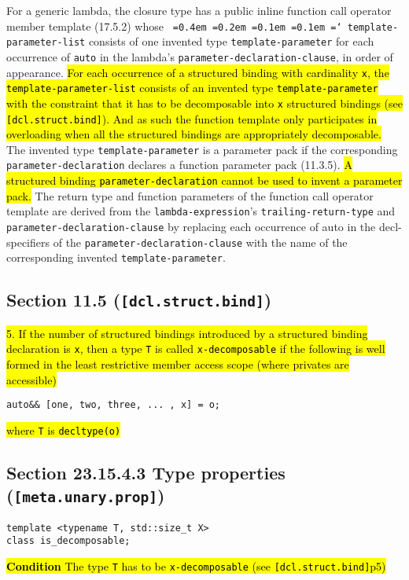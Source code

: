 \documentclass{article}
\DeclareRobustCommand{\hlgreen}[1]{{\sethlcolor{green}\hl{#1}}}
\newcommand*\justify{%
  \fontdimen2\font=0.4em%
  \fontdimen3\font=0.2em%
  \fontdimen4\font=0.1em%
  \fontdimen7\font=0.1em%
  \hyphenchar\font=`\-%
}
\begin{document}
For a generic lambda, the closure type has a public inline function call
operator member template (17.5.2) whose \texttt{\justify template-parameter-list}
consists of one invented type \texttt{template-parameter} for each occurrence
of \texttt{auto} in the lambda’s \texttt{parameter-declaration-clause}, in
order of appearance.  \hlgreen{For each occurrence of a structured binding with
cardinality \texttt{x}, the \texttt{template-parameter-list} consists of an
invented type \texttt{template-parameter} with the constraint that it has to
be decomposable into \texttt{x} structured bindings (see
\texttt{[dcl.struct.bind]}).  And as such the function template only
participates in overloading when all the structured bindings are appropriately
decomposable.} The invented type \texttt{template-parameter} is a parameter
pack if the corresponding \texttt{parameter-declaration} declares a function
parameter pack (11.3.5).  \hlgreen{A structured binding
\texttt{parameter-declaration} cannot be used to invent a parameter pack.} The
return type and function parameters of the function call operator template are
derived from the \texttt{lambda-expression}’s \texttt{trailing-return-type}
and \texttt{parameter-declaration-clause} by replacing each occurrence of auto
in the decl-specifiers of the \texttt{parameter-declaration-clause} with the
name of the corresponding invented \texttt{template-parameter}.


\subsection{Section 11.5 (\texttt{[dcl.struct.bind]})}

\hlgreen{5.  If the number of structured bindings introduced by a structured
binding declaration is \texttt{x}, then a type \texttt{T} is called
\texttt{x-decomposable} if the following is well formed in the least
restrictive member access scope (where privates are accessible)}
\begin{lstlisting}
auto&& [one, two, three, ... , x] = o;
\end{lstlisting}

\hlgreen{where \texttt{T} is \texttt{decltype(o)}}

\subsection{Section 23.15.4.3 Type properties (\texttt{[meta.unary.prop]})}

\begin{lstlisting}
template <typename T, std::size_t X>
class is_decomposable;
\end{lstlisting}

\hlgreen{\textbf{Condition} The type \texttt{T} has to be
\texttt{x-decomposable} (see \texttt{[dcl.struct.bind]}p5)}
\end{document}
